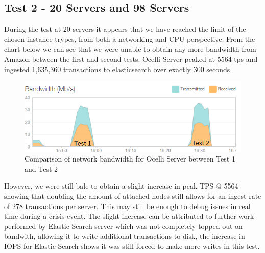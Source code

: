 \documentclass{llncs}
\begin{document}
\subsection{Test 2 - 20 Servers and 98 Servers}

During the test at 20 servers it appears that we have reached the limit of the chosen instance trypes, from both a networking and CPU perspective. From the chart below we can see that we were unable to obtain any more bandwidth from Amazon between the first and second tests. Ocelli Server peaked at 5564 tps and ingested 1,635,360 transactions to elasticsearch over exactly 300 seconds

\begin{figure}[h]
    \centering
    \includegraphics[scale=0.7]{app8}
    \caption{Comparison of network bandwidth for Ocelli Server between Test 1 and Test 2}
    \label{fig:ocelli_dm}
\end{figure}

However, we were still bale to obtain a slight increase in peak TPS @ 5564 showing that doubling the amount of attached nodes still allows for an ingest rate of 278 transactions per server. This may still be enough to debug issues in real time during a crisis event. The slight increase can be attributed to further work performed by Elastic Search server which was not completely topped out on bandwith, allowing it to write additional transactions to disk, the increase in IOPS for Elastic Search shows it was still forced to make more writes in this test.
\end{document}
